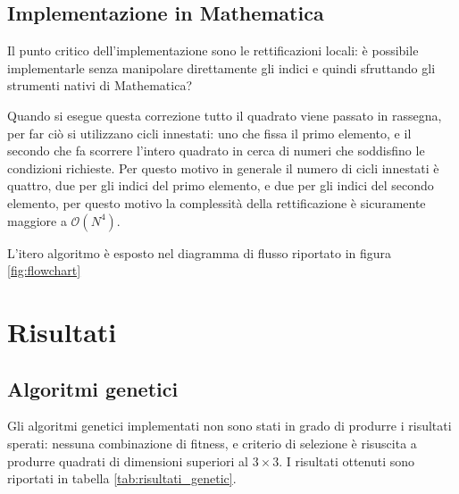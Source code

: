 \documentclass[italian,twoside,twocolumn]{article}
\begin{document}
\subsection{Implementazione in Mathematica}

Il punto critico dell'implementazione sono le rettificazioni locali: è possibile implementarle senza manipolare direttamente gli indici e quindi sfruttando gli strumenti nativi di Mathematica?

Quando si esegue questa correzione tutto il quadrato viene passato in rassegna, per far ciò si utilizzano cicli innestati: uno che fissa il primo elemento, e il secondo che fa scorrere l'intero quadrato in cerca di numeri che soddisfino le condizioni richieste. Per questo motivo in generale il numero di cicli innestati è quattro, due per gli indici del primo elemento, e due per gli indici del secondo elemento, per questo motivo la complessità della rettificazione è sicuramente maggiore a $\mathcal{O}(N^4)$. 

L'itero algoritmo è esposto nel diagramma di flusso riportato in figura \ref{fig:flowchart}


\section{Risultati}

\subsection{Algoritmi genetici}
Gli algoritmi genetici implementati non sono stati in grado di produrre i risultati sperati: nessuna combinazione di fitness, e criterio di selezione è risuscita a produrre quadrati di dimensioni superiori al $ 3\times 3 $. I risultati ottenuti sono riportati in tabella \ref{tab:risultati_genetic}.
\end{document}
